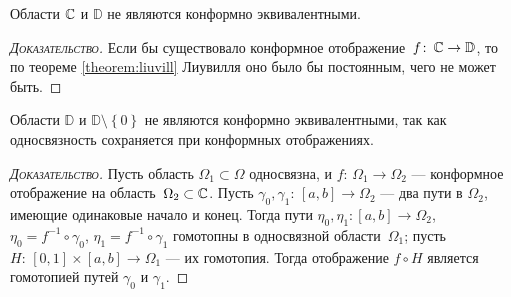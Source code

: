 \documentclass[../complex-analysis.tex]{subfiles}
\begin{document}
\begin{exmpl}
 \label{example:C non Conform Equivalent with D}
 Области $ \mathbb{C} $ и $ \mathbb D $ не являются конформно эквивалентными.
\end{exmpl}
\begin{proof}[\normalfont\textsc{Доказательство}]
  Если бы существовало конформное отображение~$ f\colon\,\mathbb{C} \to \mathbb D $, то по теореме \ref{theorem:liuvill} Лиувилля оно было бы постоянным, чего не может быть.
\end{proof}
\begin{exmpl}
 \label{example:Simple Connectivity is Invariant w respect to Conform Map}
 Области $ \mathbb D $ и $ \mathbb D \setminus \left\{ 0 \right\} $ не являются конформно эквивалентными, так как односвязность сохраняется при конформных отображениях.
\end{exmpl}
\begin{proof}[\normalfont\textsc{Доказательство}]
 Пусть область $ \Omega_1 \subset \Omega $ односвязна, и $ f \colon\, \Omega_1 \to \Omega_2 $ --- конформное отображение на область~$ \Omega_2 \subset \mathbb{C} $. Пусть $ \gamma_0, \gamma_1 \colon\,[a,b] \to \Omega_2 $ --- два пути в $ \Omega_2 $, имеющие одинаковые начало и конец. Тогда пути $ \eta_0,\eta_1 \colon [a,b] \to \Omega_2 $, $ \eta_0 = f^{-1} \circ \gamma_0 $, $ \eta_1 = f^{-1} \circ \gamma_1 $ гомотопны в односвязной области~$ \Omega_1 $; пусть $ H \colon\,[0,1] \times [a,b] \to \Omega_1 $ --- их гомотопия. Тогда отображение $ f \circ H $ является гомотопией путей $ \gamma_0 $ и $ \gamma_1 $.
\end{proof}
\end{document}
